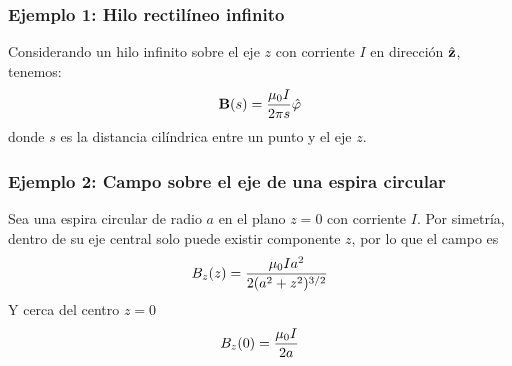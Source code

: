 \documentclass[]{article}
\numberwithin{equation}{section}
\begin{document}
\subsubsection{Ejemplo 1: Hilo rectilíneo infinito}\label{BS_ej1}
Considerando un hilo infinito sobre el eje \(z\) con corriente \(I\) en dirección \(\hat{\mathbf{z}}\), tenemos:
\begin{equation}
	\mathbf{B}(s) = \frac{\mu_{0} I}{2 \pi s}\hat{\mathbf{\varphi}}
\end{equation}
donde \(s\) es la distancia cilíndrica entre un punto y el eje \(z\).

\subsubsection{Ejemplo 2: Campo sobre el eje de una espira circular}
Sea una espira circular de radio \(a\) en el plano \(z=0\) con corriente \(I\). Por simetría, dentro de su eje central solo puede existir componente \(z\), por lo que el campo es
\begin{equation}
	B_{z}(z) = \frac{\mu_{0} I a^2}{2(a^2 + z^2)^{3/2}}
\end{equation}
Y cerca del centro \(z=0\)
\begin{equation}
	B_{z}(0) = \frac{\mu_{0} I}{2 a}
\end{equation}
\end{document}
